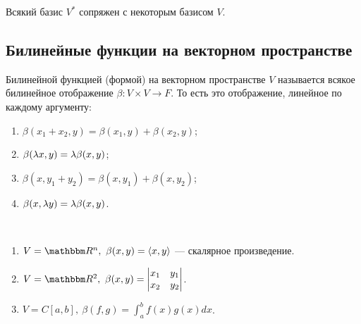 \begin{Task}
Всякий базис $V^*$ сопряжен с некоторым базисом $V$.
\end{Task}

\subsection*{Билинейные функции на векторном пространстве}

\begin{Def}
Билинейной функцией (формой) на векторном пространстве $V$ называется всякое билинейное отображение $\beta \colon V \times V \rightarrow F$. То есть это отображение, линейное по каждому аргументу:
\begin{enumerate}
\item $\beta(x_1 + x_2, y) = \beta(x_1, y) + \beta(x_2, y)$; 
\item $\beta(\lambda x, y) = \lambda\beta(x, y)$;
\item $\beta(x, y_1 + y_2) = \beta(x, y_1) + \beta(x, y_2)$;
\item $\beta(x, \lambda y) = \lambda\beta(x, y)$.
\end{enumerate}
\end{Def}

\begin{Examples}\
\begin{enumerate}
\item $V = \R^n,\ \beta(x, y) = \langle x, y \rangle$ --- скалярное произведение. 
\item $V = \R^2,\ \beta(x, y) = \begin{vmatrix}x_1 & y_1 \\ x_2 & y_2\end{vmatrix}$.
\item $V = C[a, b],\ \beta(f, g) = \int_a^bf(x)g(x)dx$.
\end{enumerate}
\end{Examples}


